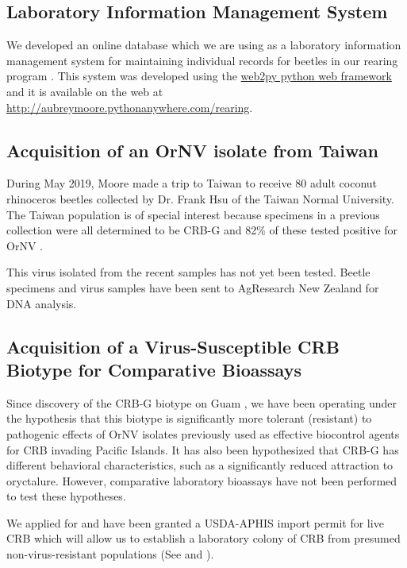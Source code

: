 \documentclass[12pt,letterpaper,english,bibliography=totocnumbered]{scrartcl}
\begin{document}
\subsection{Laboratory Information Management System}\label{lims}

We developed an online database which we are using as a laboratory information management system for maintaining individual records for beetles in our rearing program \cite{moore_coconut_2019-1}. This system was developed using the \href{http://www.web2py.com/}{web2py python web framework} and it is available on the web at \url{http://aubreymoore.pythonanywhere.com/rearing}. 

\subsection{Acquisition of an OrNV isolate from Taiwan}

During May 2019, Moore made a trip to Taiwan to receive 80 adult coconut rhinoceros
beetles collected by Dr. Frank Hsu of the Taiwan Normal University. The Taiwan population is of special interest because specimens in a previous collection
were all determined to be CRB-G and 82\% of these tested positive for OrNV \cite{watanabe_survey_2016-1}.

This virus isolated from the recent samples has not yet been tested. Beetle specimens and virus samples have been sent to AgResearch New Zealand for DNA analysis.

\subsection{Acquisition of a Virus-Susceptible CRB Biotype for Comparative Bioassays}

Since discovery of the CRB-G biotype on Guam \cite{marshall_new_2017-1}, we have been operating under the hypothesis that this biotype is significantly more tolerant (resistant) to pathogenic effects of OrNV isolates previously used as effective biocontrol agents for CRB invading Pacific Islands. It has also been hypothesized that CRB-G has different behavioral characteristics, such as a significantly reduced attraction to oryctalure. However, comparative laboratory bioassays have not been performed to test these hypotheses.

We applied for and have been granted a USDA-APHIS import permit for live CRB which will allow us to establish a laboratory colony of CRB from presumed non-virus-resistant populations (See \cite{moore_additional_2019} and \cite{usda-aphis_crb_2019}). 
\end{document}
